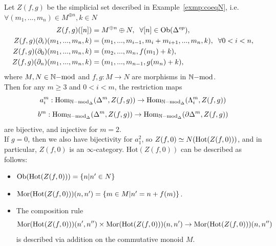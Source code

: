 \begin{proposition}\label{prop:weakskel}
Let $Z(f,g)$ be the simplicial set described in Example~\ref{exmp:coeqN}, i.e. $\forall (m_1,...,m_n) \in M^{\oplus n}, k \in N$
\begin{align*}
Z(f,g)([n]) &= M^{\oplus n} \oplus N, \; \; \forall [n] \in \operatorname{Ob}(\Delta^{op}),\\
Z(f,g)(\partial_i)(m_1,...,m_n,k) &= (m_1,...,m_{i-1}, m_i + m_{i+1},...,m_n, k), \; \;  \forall 0 < i < n,\\
Z(f,g)(\partial_0) (m_1,...,m_n,k) &= (m_2,...,m_n, f(m_1)+k),\\
Z(f,g)(\partial_n) (m_1,...,m_n,k) &= (m_1,...,m_{n-1}, g(m_n)+k),
\end{align*}
where $M, N \in \mathbb{N}\mathrm{-mod}$ and $f,g: M \to N$ are morphisms in $\mathbb{N}\mathrm{-mod}$.\\
\indent Then for any $m \ge 3$ and $0 < i < m$, the restriction maps
\[a^m_i: \operatorname{Hom}_{{\mathbb{N}\mathrm{-mod}}_{\Delta}}(\Delta^m, Z(f,g)) \rightarrow \operatorname{Hom}_{{\mathbb{N}\mathrm{-mod}}_{\Delta}}(\Lambda_i^m, Z(f,g))\]
\[b^m: \operatorname{Hom}_{{\mathbb{N}\mathrm{-mod}}_{\Delta}}(\Delta^m, Z(f,g)) \rightarrow \operatorname{Hom}_{{\mathbb{N}\mathrm{-mod}}_{\Delta}}(\partial \Delta^m, Z(f,g))\]
are bijective, and injective for $m=2$.\\
\indent If $g=0$, then we also have bijectivity for $a^2_1$, so $Z(f,0) \simeq N(\operatorname{Hot}(Z(f,0)))$, 
and in particular, $Z(f,0)$ is an $\infty$-category. $\mathrm{Hot}(Z(f,0))$ can be described as follows:
\begin{itemize}
  \item $\operatorname{Ob}(\operatorname{Hot}(Z(f,0))) = \{n| n'\in N\}$
  \item $\operatorname{Mor}(\operatorname{Hot}(Z(f,0)))(n,n') = \{m \in M | n'=n+f(m)\}$.
  \item The composition rule 
  \[\operatorname{Mor}(\operatorname{Hot}(Z(f,0)))(n',n'') \times \operatorname{Mor}(\operatorname{Hot}(Z(f,0)))(n,n') \rightarrow \operatorname{Mor}(\operatorname{Hot}(Z(f,0)))(n,n'')\]
  is described via addition on the commutative monoid $M$.
\end{itemize}
\end{proposition}

